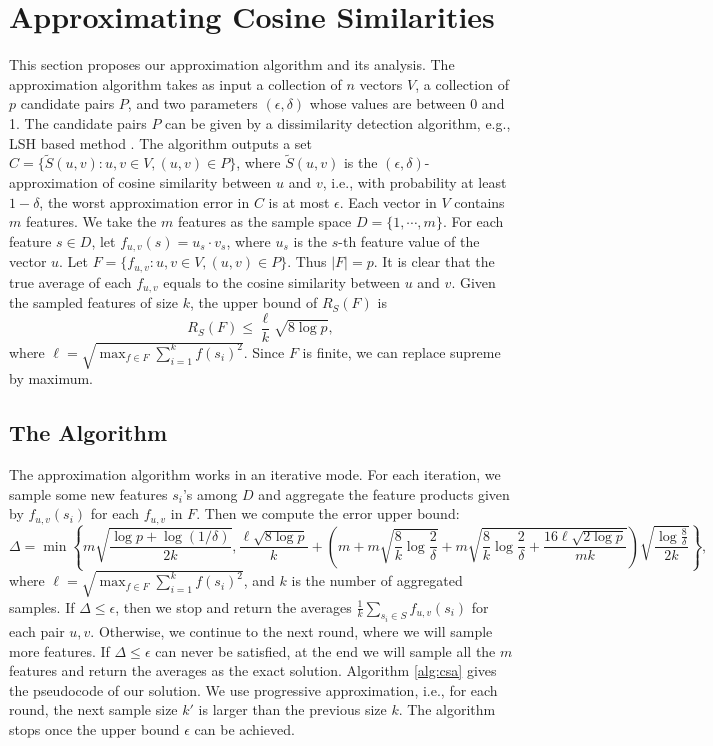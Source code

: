 \documentclass{article}
\begin{document}
\section{Approximating Cosine Similarities}
\label{sec:acs}
This section proposes our approximation algorithm and its analysis.
{\color{black}
The approximation algorithm takes as input a collection of $n$ vectors $V$, a collection of $p$ candidate pairs $P$, and two parameters $(\epsilon, \delta)$ whose values are between 0 and 1. The candidate pairs $P$ can be given by a dissimilarity detection algorithm, e.g., LSH based method \cite{LRU14}. The algorithm outputs a set $C = \{\tilde{S}(u,v): u,v \in V, (u,v)\in P\}$, where $\tilde{S}(u,v)$ is the $(\epsilon, \delta)$- approximation of cosine similarity between $u$ and $v$, i.e., with probability at least $1-\delta$, the worst approximation error in $C$ is at most $\epsilon$. Each vector in $V$ contains $m$ features. We take the $m$ features as the sample space $D = \{1,\cdots,m\}$. For each feature $s\in D$, let $f_{u,v}(s) = u_s\cdot v_s$, where $u_s$ is the $s$-th feature value of the vector $u$. Let $F = \{f_{u,v}: u,v\in V, (u,v)\in P\}$. Thus $|F| = p$. It is clear that the true average of each $f_{u,v}$ equals to the cosine similarity between $u$ and $v$. Given the sampled features of size $k$, the upper bound of $R_S(F)$ is 
$$R_S(F) \leq \frac{\ell}{k}\sqrt{8\log p},$$
where $\ell = \sqrt{\max_{f\in F} \sum_{i=1}^k f(s_i)^2}$. Since $F$ is finite, we can replace supreme by maximum. 
}

\subsection{The Algorithm}
The approximation algorithm works in an iterative mode. For each iteration, we sample some new features $s_i$'s among $D$ and aggregate the feature products given by $f_{u,v}(s_i)$ for each $f_{u,v}$ in $F$. Then we compute the error upper bound:
$$\Delta = \min\left\{m\sqrt{\frac{\log p + \log(1/\delta)}{2k}}, \frac{\ell\sqrt{8\log p}}{k} +\left(m+m\sqrt{\frac{8}{k}\log \frac{2}{\delta}} + m\sqrt{\frac{8}{k}\log \frac{2}{\delta} + \frac{16\ell\sqrt{2\log p}}{mk}}\right)\sqrt{\frac{\log \frac{8}{\delta}}{2k}}\right\},$$
where $\ell = \sqrt{\max_{f\in F} \sum_{i=1}^k f(s_i)^2}$, and $k$ is the number of aggregated samples. 
If $\Delta \leq \epsilon$, then we stop and return the averages $\frac{1}{k}\sum_{s_i\in S}f_{u,v}(s_i)$ for each pair $u, v$. Otherwise, we continue to the next round, where we will sample more features. If $\Delta \leq \epsilon$ can never be satisfied, at the end we will sample all the $m$ features and return the averages as the exact solution. Algorithm \ref{alg:csa} gives the pseudocode of our solution. We use progressive approximation, i.e., for each round, the next sample size $k'$ is larger than the previous size $k$. The algorithm stops once the upper bound $\epsilon$ can be achieved.
\end{document}
